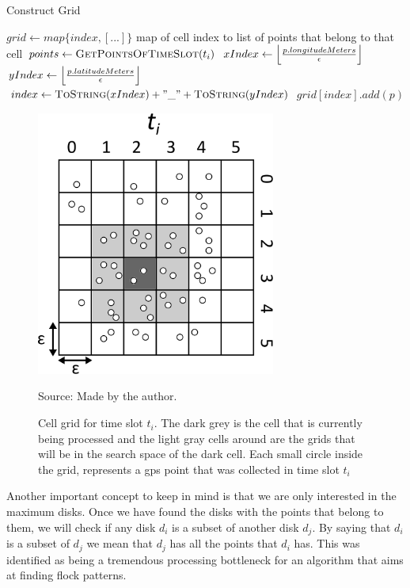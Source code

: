 \begin{algorithm}[h!]
\caption{Construct Grid}
\label{alg:grid}
\begin{algorithmic}[1]
    \State $grid \gets map\{index, [...]\}$ \Comment map of cell index to list of points that belong to that cell
    \State $points \gets \Call{GetPointsOfTimeSlot}{t_i}$
    \State
        \State $xIndex \gets \floor*{\frac{p.longitudeMeters}{\epsilon}}$
        \State $yIndex \gets \floor*{\frac{p.latitudeMeters}{\epsilon}}$
        \State
        \State $index \gets \Call{ToString}{xIndex} + "\_" + \Call{ToString}{yIndex}$
        \State $grid[index].add(p)$
    \EndFor
\end{algorithmic}
\end{algorithm}

\begin{figure}[t!]
    \centering
    \caption{Cell grid for time slot $t_i$. The dark grey is the cell that is currently being processed and the light
        gray cells around are the grids that will be in the search space of the dark cell. Each small circle inside the
        grid, represents a \ac{gps} point that was collected in time slot $t_i$}
    \centerline{\includegraphics[width=0.7\textwidth]{images/grid.eps}}
    \footnotesize{Source: Made by the author.}
    \label{fig:grid}
\end{figure}

Another important concept to keep in mind is that we are only interested in the maximum disks. Once we have found the
disks with the points that belong to them, we will check if any disk $d_i$ is a subset of another disk $d_j$. By saying
that $d_i$ is a subset of $d_j$ we mean that $d_j$ has all the points that $d_i$ has. This was identified as being a
tremendous processing bottleneck for an algorithm that aims at finding flock patterns.
